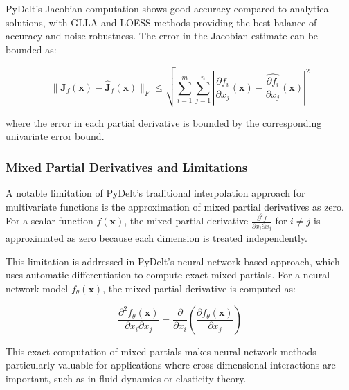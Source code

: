 \documentclass[10pt,journal,compsoc]{IEEEtran}
\begin{document}
PyDelt's Jacobian computation shows good accuracy compared to analytical solutions, with GLLA and LOESS methods providing the best balance of accuracy and noise robustness. The error in the Jacobian estimate can be bounded as:

\begin{equation}
    \|\mathbf{J}_f(\mathbf{x}) - \hat{\mathbf{J}}_f(\mathbf{x})\|_F \leq \sqrt{\sum_{i=1}^{m}\sum_{j=1}^{n} \left|\frac{\partial f_i}{\partial x_j}(\mathbf{x}) - \hat{\frac{\partial f_i}{\partial x_j}}(\mathbf{x})\right|^2}
\end{equation}

where the error in each partial derivative is bounded by the corresponding univariate error bound.

\subsubsection{Mixed Partial Derivatives and Limitations}

A notable limitation of PyDelt's traditional interpolation approach for multivariate functions is the approximation of mixed partial derivatives as zero. For a scalar function $f(\mathbf{x})$, the mixed partial derivative $\frac{\partial^2 f}{\partial x_i \partial x_j}$ for $i \neq j$ is approximated as zero because each dimension is treated independently.

This limitation is addressed in PyDelt's neural network-based approach, which uses automatic differentiation to compute exact mixed partials. For a neural network model $f_{\theta}(\mathbf{x})$, the mixed partial derivative is computed as:

\begin{equation}
    \frac{\partial^2 f_{\theta}(\mathbf{x})}{\partial x_i \partial x_j} = \frac{\partial}{\partial x_i}\left(\frac{\partial f_{\theta}(\mathbf{x})}{\partial x_j}\right)
\end{equation}

This exact computation of mixed partials makes neural network methods particularly valuable for applications where cross-dimensional interactions are important, such as in fluid dynamics or elasticity theory.
\end{document}
